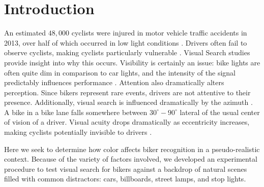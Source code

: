 \section{Introduction}



An estimated $48,000$ cyclists were injured in motor vehicle traffic accidents in
2013, over half of which occurred in low light conditions \cite{nhtsa2015}.
Drivers often fail to observe cyclists, making cyclists particularly vulnerable
\cite{wood2013bicyclists}. Visual Search studies provide insight into why this
occurs.  Visibility is certainly an issue: bike lights are often quite dim in
comparison to car lights, and the intensity of the signal predictably
influences performance \cite{engel1977visual}. Attention also dramatically
alters perception. Since bikers represent rare events, drivers are not
attentive to their presence.  Additionally, visual search is influenced
dramatically by the azimuth \cite{treisman1980feature}. A bike in a bike lane
falls somewhere between $30^\circ-90^\circ$ lateral of the usual center of
vision of a driver.  Visual acuity drops dramatically as eccentricity
increases, making cyclists potentially invisible to drivers
\cite{wolfe1998there}. 

Here we seek to determine how color affects biker recognition in a
pseudo-realistic context. Because of the variety of factors involved, we
developed an experimental procedure to test visual search for bikers against a
backdrop of natural scenes filled with common distractors: cars, billboards,
street lamps, and stop lights.
